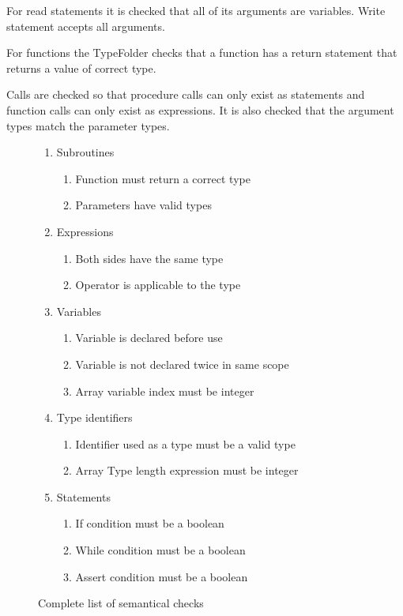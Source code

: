 \documentclass[12pt,a4paper]{article}
\begin{document}
For read statements it is checked that all of its arguments are
variables. Write statement accepts all arguments.

For functions the TypeFolder checks that a function has a return statement that
returns a value of correct type.

Calls are checked so that procedure calls can only
exist as statements and function calls can only exist as
expressions. It is also checked that the argument types match
the parameter types.


\begin{figure}
\caption{Complete list of semantical checks}
\begin{enumerate}
  \item Subroutines
    \begin{enumerate}
      \item Function must return a correct type
      \item Parameters have valid types
    \end{enumerate}
  \item Expressions
    \begin{enumerate}
      \item Both sides have the same type
      \item Operator is applicable to the type
    \end{enumerate}
  \item Variables
    \begin{enumerate}
      \item Variable is declared before use
      \item Variable is not declared twice in same scope
      \item Array variable index must be integer
    \end{enumerate}
  \item Type identifiers 
    \begin{enumerate}
      \item Identifier used as a type must be a valid type
      \item Array Type length expression must be integer
    \end{enumerate}
  \item Statements
    \begin{enumerate}
      \item If condition must be a boolean
      \item While condition must be a boolean
      \item Assert condition must be a boolean

\end{enumerate}
\end{enumerate}
\end{figure}
\end{document}
